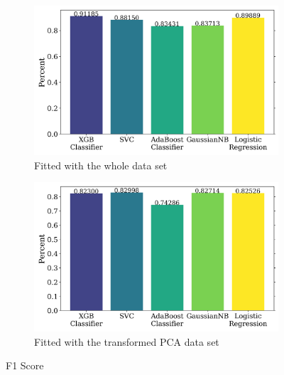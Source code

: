 \documentclass{article}
\begin{document}
\begin{figure}[H]
    \centering
    \begin{subfigure}[t]{0.495\textwidth}
        \centering
        \includegraphics[width=\textwidth]{fbeta_notpca.png}
        \caption{Fitted with the whole data set}
        \label{fig:fbeta_notpca}
    \end{subfigure}
    \hfill
    \begin{subfigure}[t]{0.495\textwidth}
        \centering
        \includegraphics[width=\textwidth]{fbeta_pca.png}
        \caption{Fitted with the transformed PCA data set}
        \label{fig:fbeta_pca}
    \end{subfigure}
    \caption{F1 Score}
    \label{fig:fbeta}
\end{figure}
\end{document}
